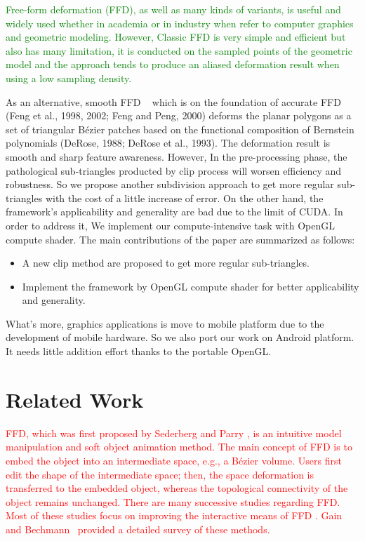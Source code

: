 \documentclass[3p]{elsarticle}
\begin{document}
\textcolor{green}{Free-form deformation (FFD\cite{Sederberg86}), as well as many kinds of variants, is useful and widely used whether in academia or in industry when refer to computer graphics and geometric modeling. However, Classic FFD is very simple and efficient but also has many limitation, it is conducted on the sampled points of the geometric model and the approach tends to produce an aliased deformation result when using a low sampling density.}

As an alternative, smooth FFD ~\cite{Cui13, Cui14, Cui15} which is on the foundation of accurate FFD (Feng et al., 1998, 2002; Feng and Peng, 2000) deforms the planar polygons as a set of triangular Bézier patches based on the functional composition of Bernstein polynomials (DeRose, 1988; DeRose et al., 1993). The deformation result is smooth and sharp feature awareness. However, In the pre-processing phase, the pathological sub-triangles producted by clip process will worsen efficiency and robustness. So we propose another subdivision approach to get more regular sub-triangles with the cost of a little increase of error. On the other hand, the framework's applicability and generality are bad due to the limit of CUDA. In order to address it, We implement our compute-intensive task with OpenGL compute shader.
The main contributions of the paper are summarized as follows:
\begin{itemize}
    \item A new clip method are proposed to get more regular sub-triangles.
    \item Implement the framework by OpenGL compute shader for better applicability and generality.
\end{itemize}

What's more, graphics applications is move to mobile platform due to the development of mobile hardware. So we also port our work on Android platform. It needs little addition effort thanks to the portable OpenGL.

\section{Related Work}\label{sec:related}

\textcolor{red}{FFD, which was first proposed by Sederberg and Parry \cite{Sederberg86}, is an intuitive model manipulation and soft
object animation method. The main concept of FFD is to embed the object into an intermediate space, e.g., a B\'ezier
volume. Users first edit the shape of the intermediate space; then, the space deformation is transferred to the embedded
object, whereas the topological connectivity of the object remains unchanged. There are many successive studies
regarding FFD. Most of these studies focus on improving the interactive means of FFD \cite{Coquillart90, Hui02,
MacCracken96, McDonnel07, Xu13}. Gain and Bechmann~\cite{Gain08} provided a detailed survey of these methods.}
\end{document}
